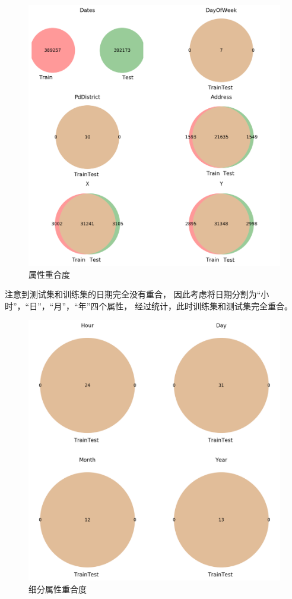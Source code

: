 \documentclass[a4paper]{article}
\begin{document}
\begin{figure}[h]
    \centering
    \includegraphics[width=\textwidth]{overlap.png}
    \caption{属性重合度}
\end{figure}

注意到测试集和训练集的日期完全没有重合，
因此考虑将日期分割为“小时”，“日”，“月”，“年”四个属性，
经过统计，此时训练集和测试集完全重合。

\begin{figure}[h]
    \centering
    \includegraphics[width=\textwidth]{overlap_2.png}
    \caption{细分属性重合度}
\end{figure}
\end{document}
